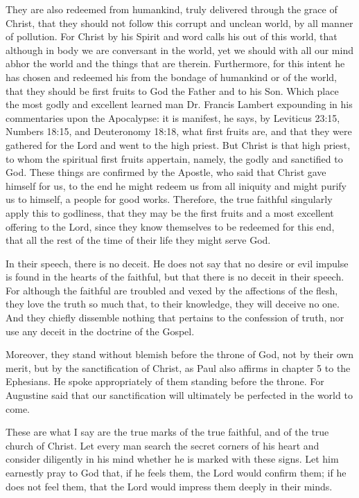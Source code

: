 They are also redeemed from humankind, truly delivered through the grace of Christ, that they should not follow this corrupt and unclean world, by all manner of pollution. For Christ by his Spirit and word calls his out of this world, that although in body we are conversant in the world, yet we should with all our mind abhor the world and the things that are therein. Furthermore, for this intent he has chosen and redeemed his from the bondage of humankind or of the world, that they should be first fruits to God the Father and to his Son. Which place the most godly and excellent learned man Dr. Francis Lambert expounding in his commentaries upon the Apocalypse: it is manifest, he says, by Leviticus 23:15, Numbers 18:15, and Deuteronomy 18:18, what first fruits are, and that they were gathered for the Lord and went to the high priest. But Christ is that high priest, to whom the spiritual first fruits appertain, namely, the godly and sanctified to God. These things are confirmed by the Apostle, who said that Christ gave himself for us, to the end he might redeem us from all iniquity and might purify us to himself, a people for good works. Therefore, the true faithful singularly apply this to godliness, that they may be the first fruits and a most excellent offering to the Lord, since they know themselves to be redeemed for this end, that all the rest of the time of their life they might serve God.

In their speech, there is no deceit. He does not say that no desire or evil impulse is found in the hearts of the faithful, but that there is no deceit in their speech. For although the faithful are troubled and vexed by the affections of the flesh, they love the truth so much that, to their knowledge, they will deceive no one. And they chiefly dissemble nothing that pertains to the confession of truth, nor use any deceit in the doctrine of the Gospel.

Moreover, they stand without blemish before the throne of God, not by their own merit, but by the sanctification of Christ, as Paul also affirms in chapter 5 to the Ephesians. He spoke appropriately of them standing before the throne. For Augustine said that our sanctification will ultimately be perfected in the world to come.

These are what I say are the true marks of the true faithful, and of the true church of Christ. Let every man search the secret corners of his heart and consider diligently in his mind whether he is marked with these signs. Let him earnestly pray to God that, if he feels them, the Lord would confirm them; if he does not feel them, that the Lord would impress them deeply in their minds.

